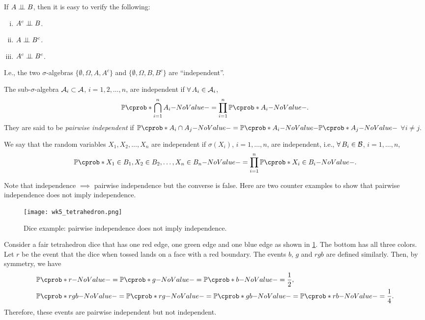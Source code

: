 \documentclass[12pt]{article}
\begin{document}
If $A \independent B$, then it is easy to verify the following:
\begin{enumerate}[(i)]
\item $A^c \independent B$.
\item $A \independent B^c$.
\item $A^c \independent B^c$.
\end{enumerate}
I.e., the two $\sigma$-algebras $\{\emptyset,\Omega ,A, A^c\}$ and $\{\emptyset,\Omega ,B, B^c\}$ are ``independent''.

\begin{Definition}
The sub-$\sigma$-algebra $\mathcal{A}_i \subset \mathcal{A}$, $i=1,2,\ldots, n$, are independent if $\forall A_i \in \calA_i$, 
\begin{align*}
\P(\bigcap_{i=1}^n {A_i})= \prod_{i=1}^n {\P(A_i)}.
\end{align*}
They are said to be \emph{pairwise independent} if $\P(A_i \cap A_j)=\P(A_i)\P(A_j)$ $\forall i \neq j$.
\end{Definition}

We say that the random variables $X_1,X_2,\ldots,X_n$ are independent if $\sigma(X_i)$, $i=1,\ldots,n$, are independent, i.e., $\forall B_i \in \calB$, $i=1,\ldots,n$,
\begin{align*}
\P (X_1\in B_1,X_2\in B_2,\ldots,X_n\in B_n)= \prod_{i=1}^n {\P(X_i \in B_i)}.
\end{align*}

Note that independence $\implies$ pairwise independence but the converse is false. Here are two counter examples to show that pairwise independence does not imply independence.

\begin{Example}\label{wk5:Independence1}
\begin{figure}[!htb]
\centering
\texttt{[image: wk5\_tetrahedron.png]} 
\caption{Dice example: pairwise independence does not imply independence.} 
\label{wk5:fg:Independence}
\end{figure}
Consider a fair tetrahedron dice that has one red edge, one green edge and one blue edge as shown in \cref{wk5:fg:Independence}. The bottom has all three colors. Let $r$ be the event that the dice when tossed lands on a face with a red boundary. The events $b$, $g$ and $rgb$ are defined similarly. Then, by symmetry, we have
\begin{align*}
&\P (r)=\P(g)=\P(b)=\frac{1}{2}, \\
&\P (rgb)=\P(rg)=\P(gb)=\P(rb)=\frac{1}{4}.
\end{align*}
Therefore, these events are pairwise independent but not independent.
\end{Example}
\end{document}
